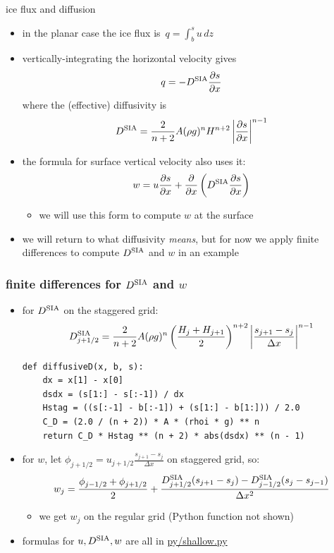 \documentclass[10pt,dvipsnames]{beamer}
\newcommand{\ds}{\displaystyle}
\newcommand{\Dsia}{D^{\text{\textrm{SIA}}}}
\begin{document}
\begin{frame}{ice flux and diffusion}

\begin{itemize}
\item in the planar case the ice flux is \,$\ds q = \int_b^s u\,dz$
\item vertically-integrating the horizontal velocity gives
    $$q  = - \Dsia \frac{\partial s}{\partial x}$$
where the (effective) \alert{diffusivity} is
    $$\Dsia = \frac{2}{n+2} A (\rho g)^n H^{n+2} \left|\frac{\partial s}{\partial x}\right|^{n-1}$$
\item the formula for surface vertical velocity also uses it:
    $$w = u \frac{\partial s}{\partial x} + \frac{\partial}{\partial x} \left(\Dsia \frac{\partial s}{\partial x}\right)$$

  \begin{itemize}
  \item[$\circ$] we will use this form to compute $w$ at the surface
  \end{itemize}
\item we will return to what diffusivity \emph{means}, but for now we apply finite differences to compute $\Dsia$ and $w$ in an example
\end{itemize}
\end{frame}


\begin{frame}[fragile]
\frametitle{finite differences for $\Dsia$ and $w$}

\begin{itemize}
\item for $\Dsia$ on the staggered grid:
    $$\Dsia_{j+1/2} = \frac{2}{n+2} A (\rho g)^n \left(\frac{H_j + H_{j+1}}{2}\right)^{n+2} \left|\frac{s_{j+1}-s_j}{\Delta x}\right|^{n-1}$$
\begin{lstlisting}[language=PythonPlus]
def diffusiveD(x, b, s):
    dx = x[1] - x[0]
    dsdx = (s[1:] - s[:-1]) / dx
    Hstag = ((s[:-1] - b[:-1]) + (s[1:] - b[1:])) / 2.0
    C_D = (2.0 / (n + 2)) * A * (rhoi * g) ** n
    return C_D * Hstag ** (n + 2) * abs(dsdx) ** (n - 1)
\end{lstlisting}
\item for $w$, let $\phi_{j+1/2} = u_{j+1/2} \frac{s_{j+1}-s_j}{\Delta x}$ on staggered grid, so:
    $$w_j = \frac{\phi_{j-1/2} + \phi_{j+1/2}}{2} + \frac{\Dsia_{j+1/2} (s_{j+1}-s_j) - \Dsia_{j-1/2} (s_{j}-s_{j-1})}{\Delta x^2}$$

  \begin{itemize}
  \item[$\circ$] we get $w_j$ on the regular grid (Python function not shown)
  \end{itemize}

\bigskip
\item formulas for $u,\Dsia,w$ are all in \href{https://github.com/bueler/mccarthy/blob/master/py/shallow.py}{py/shallow.py}
\end{itemize}
\end{frame}
\end{document}
